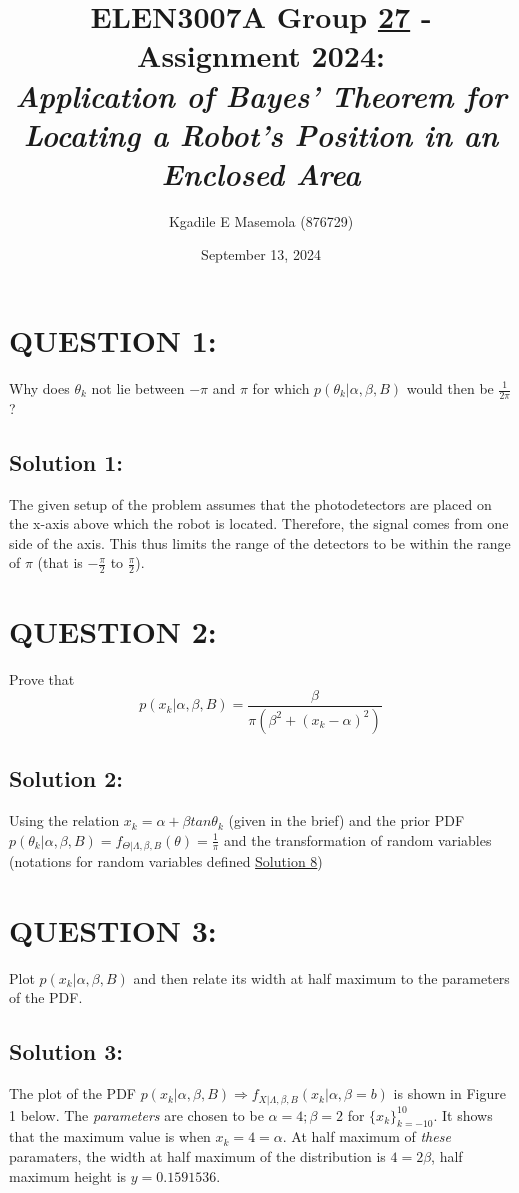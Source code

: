 \documentclass[a4paper,11pt]{article}
\title{ELEN3007A Group \underline{27} - Assignment 2024: \\ 
\large \emph{Application of Bayes’ Theorem for Locating a Robot’s
Position in an Enclosed Area}}
\author{Kgadile E Masemola (876729)}
\date{September 13, 2024}
\begin{document}
\maketitle

\section{QUESTION 1:}  Why does $\theta_k$ not lie between $- \pi$ and $\pi$ for which $p(\theta_k | \alpha, \beta, B)$ would then be $\frac{1}{2\pi}$?

\subsection{Solution 1:}
The given setup of the problem assumes that the photodetectors are placed on the x-axis above which the robot is located. Therefore, the signal comes from one side of the axis. This thus limits the range of the detectors to be within the range of $\pi$ (that is $-\frac{\pi}{2}$ to $\frac{\pi}{2}$). 

\section{QUESTION 2:}
Prove that
\begin{equation}
	p(x_k | \alpha, \beta, B) = \frac{\beta}{\pi (\beta^2 + (x_k - \alpha)^2)}
\end{equation}
\subsection{Solution 2:}
Using the relation $x_k = \alpha + \beta tan \theta_k$ (given in the brief) and the prior PDF $p(\theta_k | \alpha, \beta, B) = f_{\Theta | \Lambda, \beta, B}(\theta) = \frac{1}{\pi}$ and the transformation of random variables (notations for random variables defined \hyperref[sec:notation]{Solution 8})

\section{QUESTION 3:}
Plot $p(x_k | \alpha, \beta, B)$ and then relate its width at half maximum to the parameters of the PDF.

\subsection{Solution 3:}
The plot of the PDF $ p(x_k | \alpha, \beta, B) \Rightarrow f_{X | \Lambda, \beta, B}(x_k | \alpha, \beta = b)$ is shown in Figure 1 below. The \emph{parameters} are chosen to be $\alpha = 4; \beta = 2$ for $\{x_k \}^ {10} _{k = -10}$. It shows that the maximum value is when $x_k = 4 = \alpha$. At half maximum of \emph{these} paramaters, the width at half maximum of the distribution is $4 = 2 \beta$, half maximum height is $y = 0.1591536$.
\end{document}
